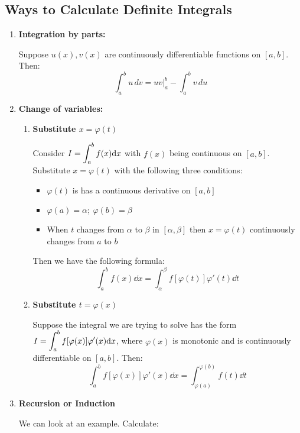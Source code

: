 \documentclass[12pt]{article}
\begin{document}
\subsection{Ways to Calculate Definite Integrals}
\begin{enumerate}
    \item \textbf{Integration by parts:}
    \par Suppose $u(x),v(x)$ are continuously differentiable functions on $[a,b]$. Then:
    \[
    \int_a^b u \, dv =  uv \Bigg|_a^b - \int_a^b v \, du
    \]
    \item \textbf{Change of variables:}
    \begin{enumerate}
        \item \textbf{Substitute $x = \varphi(t)$}
        \par Consider $I = \mathlarger{\int_a^b f(x) \dd x}$ with $f(x)$ being continuous on $[a,b]$. Substitute $x = \varphi(t)$ with the following three conditions:
        \begin{itemize}
            \item $\varphi(t)$ is has a continuous derivative on $[a,b]$
            \item $\varphi(a) = \alpha ; \ \varphi(b) = \beta$
            \item When $t$ changes from $\alpha$ to $\beta$ in $[\alpha,\beta]$ then $x = \varphi(t)$ continuously changes from $a$ to $b$
        \end{itemize}
        Then we have the following formula:
    \begin{equation*}
        \int_a^b f(x) \dd x = \int_{\alpha}^{\beta}f[\varphi(t)]\varphi'(t) \dd t
    \end{equation*}
    \item \textbf{Substitute $t = \varphi(x)$} 
    \par Suppose the integral we are trying to solve has the form $I = \mathlarger{\int_a^b f[\varphi(x)]\varphi'(x) \dd x}$, where $\varphi(x)$ is monotonic and is continuously differentiable on $[a,b]$. Then:
    \begin{equation*}
        \int_a^b f[\varphi(x)]\varphi'(x) \dd x = \int_{\varphi(a)}^{\varphi(b)}f(t) \dd t
    \end{equation*}
    \end{enumerate}
    \item \textbf{Recursion or Induction}
    \par We can look at an example. Calculate:
    \begin{equation*}

\end{equation*}
\end{enumerate}
\end{document}
